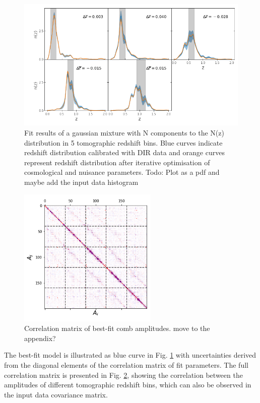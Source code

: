\documentclass{aa}
\begin{document}
\begin{figure}
\centering
\includegraphics[width=\linewidth]{plots/optimisation_result.png}
\caption{Fit results of a gaussian mixture with N components to the N(z) distribution in 5 tomographic redshift bins. Blue curves indicate redshift distribution calibrated with DIR data and orange curves represent redshift distribution after iterative optimisation of cosmological and nuisance parameters. {\color{red} Todo: Plot as a pdf and maybe add the input data histogram}}
\label{fig:comb}
\end{figure}
\begin{figure}
\centering
\includegraphics[scale=0.7]{plots/corr.png}
\caption{Correlation matrix of best-fit comb amplitudes. {\color{red} move to the appendix?}}
\label{fig:correlation_matrix}
\end{figure}
The best-fit model is illustrated as blue curve in Fig. \ref{fig:comb} with uncertainties derived from the diagonal elements of the correlation matrix of fit parameters. The full correlation matrix  is presented in Fig. \ref{fig:correlation_matrix}, showing the correlation between the amplitudes of different tomographic redshift bins, which can also be observed in the input data covariance matrix.  
\end{document}
